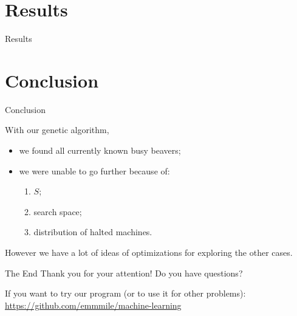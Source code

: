 \documentclass{beamer}
\begin{document}
\section{Results}

\begin{frame}{Results}
\begin{center}
\end{center}
\end{frame}

\section{Conclusion}

\begin{frame}{Conclusion}

  With our genetic algorithm,
  \begin{itemize}
  \item we found all currently known busy beavers;
  \item we were unable to go further because of:
    \begin{enumerate}
    \item $S$;
    \item search space;
    \item distribution of halted machines.
    \end{enumerate}
  \end{itemize}

  \vspace{1cm} %
  However we have a lot of ideas of optimizations for exploring the other cases.
\end{frame}

\begin{frame}{The End}
  Thank you for your attention!
  Do you have questions?

  \vspace{2cm} %

  If you want to try our program (or to use it for other problems):
  \url{https://github.com/emmmile/machine-learning}
\end{frame}
\end{document}
